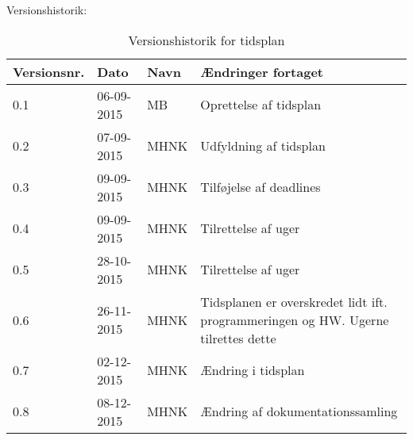 \documentclass[landscape, 12pt, letterpaper]{article}
\begin{document}
\begin{table}[]
Versionshistorik:
\centering
\caption{Versionshistorik for tidsplan}
\label{my-label}
\begin{tabular}{|l|l|l|l|}
\hline
Versionsnr. & Dato       & Navn & Ændringer fortaget     \\ \hline
0.1         & 06-09-2015 & MB   & Oprettelse af tidsplan \\ \hline
0.2         & 07-09-2015 & MHNK & Udfyldning af tidsplan \\ \hline
0.3         & 09-09-2015 & MHNK & Tilføjelse af deadlines\\ \hline
0.4         & 09-09-2015 & MHNK & Tilrettelse af uger    \\ \hline
0.5         & 28-10-2015 & MHNK & Tilrettelse af uger    \\ \hline
0.6         & 26-11-2015 & MHNK & Tidsplanen er overskredet lidt ift. programmeringen og HW.
 Ugerne tilrettes dette     \\ \hline	
0.7         & 02-12-2015 & MHNK & Ændring i tidsplan    \\ \hline
0.8         & 08-12-2015 & MHNK & Ændring af dokumentationssamling    \\ \hline
\end{tabular}
\end{table}
\end{document}
